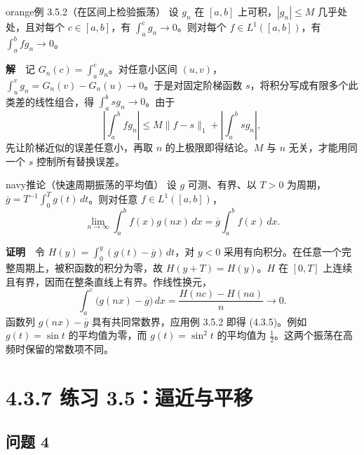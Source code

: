 \documentclass[11pt,a4paper]{article}
\begin{document}
\begin{sboxenv}{orange}{例 3.5.2（在区间上检验振荡）}
设 \(g_n\) 在 \([a,b]\) 上可积，\(|g_n|\le M\) 几乎处处，且对每个
\(c\in[a,b]\)，有 \(\int_a^c g_n\to0\)。则对每个 \(f\in L^1([a,b])\)，有
\(\int_a^b f g_n\to0\)。

\end{sboxenv}

\textbf{解}　记 \(G_n(c)=\int_a^c g_n\)。对任意小区间
\((u,v)\)，\(\int_u^v g_n=G_n(v)-G_n(u)\to0\)。于是对固定阶梯函数
\(s\)，将积分写成有限多个此类差的线性组合，得
\(\int_a^b s g_n\to0\)。由于 \begin{equation*}
\left|\int_a^b f g_n\right|
\le M\|f-s\|_1+\left|\int_a^b s g_n\right|,
\end{equation*} 先让阶梯近似的误差任意小，再取 \(n\) 的上极限即得结论。\(M\) 与 \(n\)
无关，才能用同一个 \(s\) 控制所有替换误差。

\begin{sboxenv}{navy}{推论（快速周期振荡的平均值）}
设 \(g\) 可测、有界、以 \(T>0\)
为周期，\(\overline g=T^{-1}\int_0^Tg(t)\,dt\)。则对任意
\(f\in L^1([a,b])\)， \begin{equation*}
\lim_{n\to\infty}\int_a^b f(x)g(nx)\,dx
=\overline g\int_a^b f(x)\,dx .
\tag{4.3.5}
\end{equation*}

\end{sboxenv}

\textbf{证明}　令 \(H(y)=\int_0^y(g(t)-\overline g)\,dt\)，对 \(y<0\)
采用有向积分。在任意一个完整周期上，被积函数的积分为零，故
\(H(y+T)=H(y)\)。\(H\) 在 \([0,T]\)
上连续且有界，因而在整条直线上有界。作线性换元， \begin{equation*}
\int_a^c\bigl(g(nx)-\overline g\bigr)\,dx
=\frac{H(nc)-H(na)}{n}\longrightarrow0 .
\end{equation*} 函数列 \(g(nx)-\overline g\) 具有共同常数界，应用例 3.5.2 即得
(4.3.5)。例如 \(g(t)=\sin t\) 的平均值为零，而 \(g(t)=\sin^2t\)
的平均值为 \(\frac{1}{2}\)。这两个振荡在高频时保留的常数项不同。

\section[\S{}4.3.7 练习
3.5：逼近与平移]{4.3.7 练习
3.5：逼近与平移}\label{ux7ec3ux4e60-3.5ux903cux8fd1ux4e0eux5e73ux79fb}

\subsection{问题 4}\label{ux95eeux9898-4}
\end{document}
